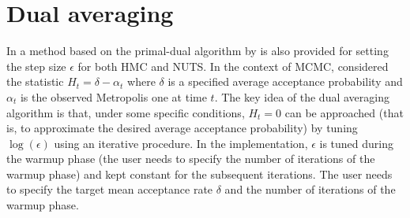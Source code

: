 \documentclass{article}
\begin{document}
\section{Dual averaging}

In \citet{hoffman2014nuts} a method based on the primal-dual algorithm by \citet{nesterov2009dual} is also provided for setting the step size $\epsilon$ for both HMC and NUTS.
In the context of MCMC, considered the statistic $H_t=\delta-\alpha_t$ where $\delta$ is a specified average acceptance probability and $\alpha_t$ is the observed Metropolis one at time $t$. %
The key idea of the dual averaging algorithm is that, under some specific conditions, $H_t=0$ can be approached (that is, to approximate the desired average acceptance probability) by tuning $\log(\epsilon)$ using an iterative procedure. In the implementation, $\epsilon$ is tuned during the warmup phase (the user needs to specify the number of iterations of the warmup phase) and kept constant for the subsequent iterations. The user needs to specify the target mean acceptance rate $\delta$ and the number of iterations of the warmup phase.

\vspace{0.5in}

%
%
%


\end{document}
